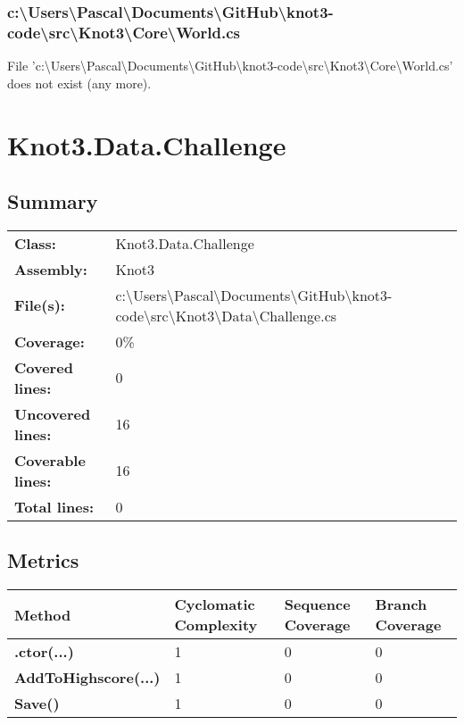 \documentclass[a4paper,10pt]{article}
\begin{document}
\subsubsection{c:\textbackslash Users\textbackslash Pascal\textbackslash Documents\textbackslash GitHub\textbackslash knot3-code\textbackslash src\textbackslash Knot3\textbackslash Core\textbackslash World.cs}
 File 'c:\textbackslash Users\textbackslash Pascal\textbackslash Documents\textbackslash GitHub\textbackslash knot3-code\textbackslash src\textbackslash Knot3\textbackslash Core\textbackslash World.cs' does not exist (any more).
\newpage
\section{Knot3.Data.Challenge}
\subsection{Summary}
\begin{longtable}[l]{ll}
\textbf{Class:} & Knot3.Data.Challenge\\
\textbf{Assembly:} & Knot3\\
\textbf{File(s):} & \begin{minipage}[t]{12cm}{c:\textbackslash Users\textbackslash Pascal\textbackslash Documents\textbackslash GitHub\textbackslash knot3-code\textbackslash src\textbackslash Knot3\textbackslash Data\textbackslash Challenge.cs}\end{minipage} \\
\textbf{Coverage:} & 0\%\\
\textbf{Covered lines:} & 0\\
\textbf{Uncovered lines:} & 16\\
\textbf{Coverable lines:} & 16\\
\textbf{Total lines:} & 0\\
\end{longtable}
\subsection{Metrics}
\begin{longtable}[l]{|l|l|l|l|}
\hline
\textbf{Method} & \textbf{Cyclomatic Complexity} & \textbf{Sequence Coverage} & \textbf{Branch Coverage}\\
\hline
\textbf{.ctor(...)} & 1 & 0 & 0\\
\hline
\textbf{AddToHighscore(...)} & 1 & 0 & 0\\
\hline
\textbf{Save()} & 1 & 0 & 0\\
\hline
\end{longtable}
\end{document}

